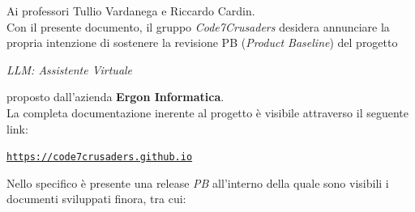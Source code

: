 \documentclass{article}
\begin{document}
Ai professori Tullio Vardanega e Riccardo Cardin.\\
Con il presente documento, il gruppo \textit{Code7Crusaders} desidera annunciare la propria intenzione di sostenere
la revisione PB (\textit{Product Baseline}) del progetto
\begin{center}
    \textit{LLM: Assistente Virtuale}
\end{center}
proposto dall'azienda \textbf{Ergon Informatica}.\\
La completa documentazione inerente al progetto è visibile attraverso il seguente link:
\begin{center}
    \texttt{\url{https://code7crusaders.github.io}}
\end{center}
Nello specifico è presente una release \textit{PB} all'interno della quale sono visibili i documenti sviluppati finora, tra cui:
\end{document}
